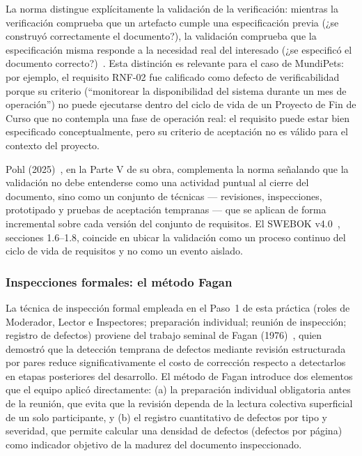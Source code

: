 \documentclass[journal,onecolumn]{IEEEtran}
\begin{document}
	La norma distingue explícitamente la validación de la
	verificación: mientras la verificación comprueba que un artefacto
	cumple una especificación previa (¿se construyó correctamente el
	documento?), la validación comprueba que la especificación misma
	responde a la necesidad real del interesado (¿se especificó el
	documento correcto?)~\cite{ieee29148_2018}. Esta distinción es
	relevante para el caso de MundiPets: por ejemplo, el requisito
	RNF-02 fue calificado como defecto de verificabilidad porque su
	criterio (``monitorear la disponibilidad del sistema durante un mes
	de operación'') no puede ejecutarse dentro del ciclo de vida de un
	Proyecto de Fin de Curso que no contempla una fase de operación
	real: el requisito puede estar bien especificado conceptualmente,
	pero su criterio de aceptación no es válido para el contexto del
	proyecto.
	
	Pohl (2025)~\cite{pohl2025}, en la Parte V de su obra, complementa
	la norma señalando que la validación no debe entenderse como una
	actividad puntual al cierre del documento, sino como un conjunto
	de técnicas --- revisiones, inspecciones, prototipado y pruebas de
	aceptación tempranas --- que se aplican de forma incremental sobre
	cada versión del conjunto de requisitos. El SWEBOK
	v4.0~\cite{swebok2024}, secciones 1.6--1.8, coincide en ubicar la
	validación como un proceso continuo del ciclo de vida de requisitos
	y no como un evento aislado.
	
	\subsubsection{Inspecciones formales: el método Fagan}
	
	La técnica de inspección formal empleada en el Paso~1 de esta
	práctica (roles de Moderador, Lector e Inspectores; preparación
	individual; reunión de inspección; registro de defectos) proviene
	del trabajo seminal de Fagan (1976)~\cite{fagan1976}, quien
	demostró que la detección temprana de defectos mediante revisión
	estructurada por pares reduce significativamente el costo de
	corrección respecto a detectarlos en etapas posteriores del
	desarrollo. El método de Fagan introduce dos elementos que el
	equipo aplicó directamente: (a) la preparación individual
	obligatoria antes de la reunión, que evita que la revisión dependa
	de la lectura colectiva superficial de un solo participante, y (b)
	el registro cuantitativo de defectos por tipo y severidad, que
	permite calcular una densidad de defectos (defectos por página)
	como indicador objetivo de la madurez del documento inspeccionado.
	
\end{document}
